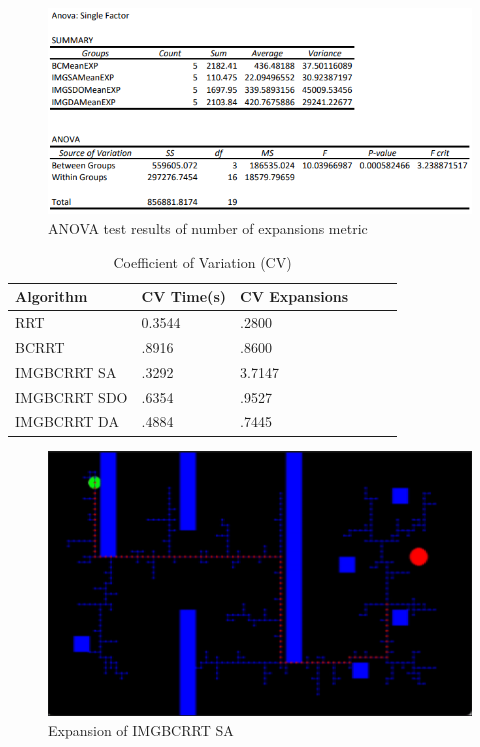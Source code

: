 \documentclass{article}
\begin{document}
\begin{figure}[h]
	\centerline{\includegraphics[scale=0.7]{ANOVAEXP.png}}
        \caption{ANOVA test results of number of expansions metric}
\end{figure}

\begin{table}[h]
  \caption{Coefficient of Variation (CV)}
  \label{CV}
  \centering
  \begin{tabular}{llllll}
    \cmidrule(r){1-3}
   Algorithm  & CV Time(s) &  CV Expansions\\
    \midrule
    RRT & 0.3544 & .2800\\
    BCRRT & .8916 & .8600\\
    IMGBCRRT SA & .3292 & 3.7147\\
     IMGBCRRT SDO & .6354 & .9527\\
     IMGBCRRT DA  & .4884 & .7445\\
    \bottomrule
  \end{tabular}
\end{table}

\begin{figure}[h]
	\centerline{\includegraphics[scale=0.60]{IMGSA.png}}
        \caption{Expansion of IMGBCRRT SA}
\end{figure}
\end{document}
